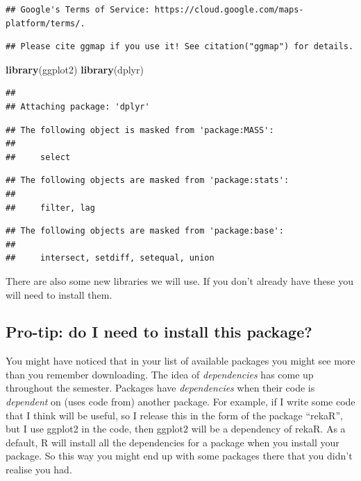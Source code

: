\documentclass[]{book}
\newenvironment{Shaded}{\begin{snugshade}}{\end{snugshade}}
\newcommand{\KeywordTok}[1]{\textcolor[rgb]{0.13,0.29,0.53}{\textbf{#1}}}
\newcommand{\NormalTok}[1]{#1}
\begin{document}
\begin{verbatim}
## Google's Terms of Service: https://cloud.google.com/maps-platform/terms/.
\end{verbatim}

\begin{verbatim}
## Please cite ggmap if you use it! See citation("ggmap") for details.
\end{verbatim}

\begin{Shaded}
\begin{Highlighting}[]
\KeywordTok{library}\NormalTok{(ggplot2)}
\KeywordTok{library}\NormalTok{(dplyr)}
\end{Highlighting}
\end{Shaded}

\begin{verbatim}
## 
## Attaching package: 'dplyr'
\end{verbatim}

\begin{verbatim}
## The following object is masked from 'package:MASS':
## 
##     select
\end{verbatim}

\begin{verbatim}
## The following objects are masked from 'package:stats':
## 
##     filter, lag
\end{verbatim}

\begin{verbatim}
## The following objects are masked from 'package:base':
## 
##     intersect, setdiff, setequal, union
\end{verbatim}

There are also some new libraries we will use. If you don't already have these you will need to install them.

\hypertarget{pro-tip-do-i-need-to-install-this-package}{%
\subsection{Pro-tip: do I need to install this package?}\label{pro-tip-do-i-need-to-install-this-package}}

You might have noticed that in your list of available packages you might see more than you remember downloading. The idea of \emph{dependencies} has come up throughout the semester. Packages have \emph{dependencies} when their code is \emph{dependent} on (uses code from) another package. For example, if I write some code that I think will be useful, so I release this in the form of the package ``rekaR'', but I use ggplot2 in the code, then ggplot2 will be a dependency of rekaR. As a default, R will install all the dependencies for a package when you install your package. So this way you might end up with some packages there that you didn't realise you had.
\end{document}
